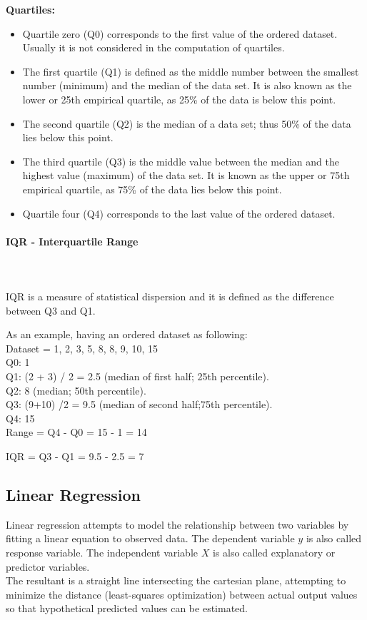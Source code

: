 \documentclass{article}
\begin{document}
\textbf{Quartiles:}
\begin{itemize}
    \item Quartile zero (Q0) corresponds to the first value of the ordered dataset. Usually it is not considered in the computation of quartiles.
    \item The first quartile (Q1) is defined as the middle number between the smallest number (minimum) and the median of the data set. It is also known as the lower or 25th empirical quartile, as 25\% of the data is below this point.
    \item The second quartile (Q2) is the median of a data set; thus 50\% of the data lies below this point.
    \item The third quartile (Q3) is the middle value between the median and the highest value (maximum) of the data set. It is known as the upper or 75th empirical quartile, as 75\% of the data lies below this point.
    \item Quartile four (Q4) corresponds to the last value of the ordered dataset.
\end{itemize}

\paragraph{IQR - Interquartile Range}\mbox{} \\
\mbox{} \\
IQR is a measure of statistical dispersion and it is defined as the difference between Q3 and Q1.

As an example, having an ordered dataset as following:\\
Dataset = 1, 2, 3, 5, 8, 8, 9, 10, 15\\
Q0: 1\\
Q1: (2 + 3) / 2 = 2.5 (median of first half; 25th percentile).\\
Q2: 8 (median; 50th percentile).\\
Q3: (9+10)  /2 = 9.5 (median of second half;75th percentile).\\
Q4: 15\\

Range = Q4 - Q0 = 15 - 1 = 14

IQR = Q3 - Q1 = 9.5 - 2.5 = 7

\subsection{Linear Regression}
Linear regression attempts to model the relationship between two variables by fitting a linear equation to observed data. The dependent variable $y$ is also called response variable. The independent variable $X$ is also called explanatory or predictor variables. \\
The resultant is a straight line intersecting the cartesian plane, attempting to minimize the distance (least-squares optimization) between actual output values so that hypothetical predicted values can be estimated.
\end{document}
